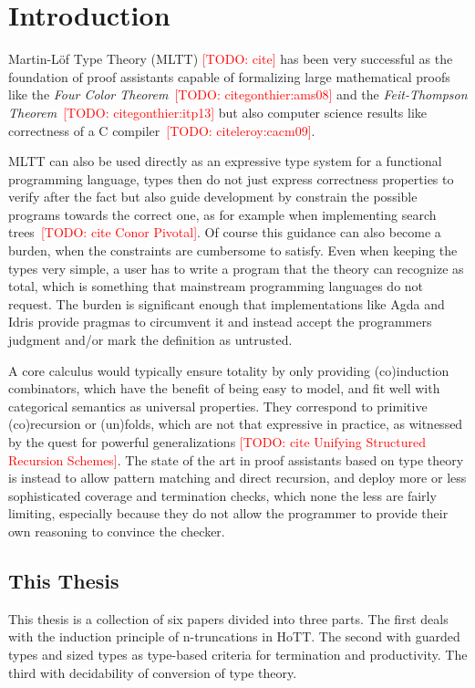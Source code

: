 \documentclass{book}
\newcommand{\TODO}[1]{\textcolor{red}{[TODO: #1]}}
\begin{document}
\chapter{Introduction}

Martin-Löf Type Theory (MLTT) \TODO{cite} has been very successful as
the foundation of proof assistants capable of formalizing large
mathematical proofs like the \emph{Four Color
  Theorem}~\TODO{cite{gonthier:ams08}} and the \emph{Feit-Thompson
  Theorem}~\TODO{cite{gonthier:itp13}} but also computer science results
like correctness of a C compiler~\TODO{cite{leroy:cacm09}}.

MLTT can also be used directly as an expressive type system for a
functional programming language, types then do not just express
correctness properties to verify after the fact but also guide
development by constrain the possible programs towards the correct
one, as for example when implementing search trees~\TODO{cite Conor Pivotal}.
Of course this guidance can also become a burden, when the constraints
are cumbersome to satisfy. Even when keeping the types very simple, a
user has to write a program that the theory can recognize as total,
which is something that mainstream programming languages do not
request. The burden is significant enough that implementations like
Agda and Idris provide pragmas to circumvent it and instead accept the
programmers judgment and/or mark the definition as untrusted.

A core calculus would typically ensure totality by only providing
(co)induction combinators, which have the benefit of being easy to
model, and fit well with categorical semantics as universal
properties. They correspond to primitive (co)recursion or (un)folds,
which are not that expressive in practice, as witnessed by the quest
for powerful generalizations \TODO{cite Unifying Structured Recursion
  Schemes}. The state of the art in proof assistants based on type
theory is instead to allow pattern matching and direct recursion, and
deploy more or less sophisticated coverage and termination checks,
which none the less are fairly limiting, especially because they do
not allow the programmer to provide their own reasoning to convince
the checker.

\section{This Thesis}

This thesis is a collection of six papers divided into three parts.
The first deals with the induction principle of n-truncations in HoTT.
The second with guarded types and sized types as type-based criteria
for termination and productivity. The third with decidability of
conversion of type theory.
\end{document}
